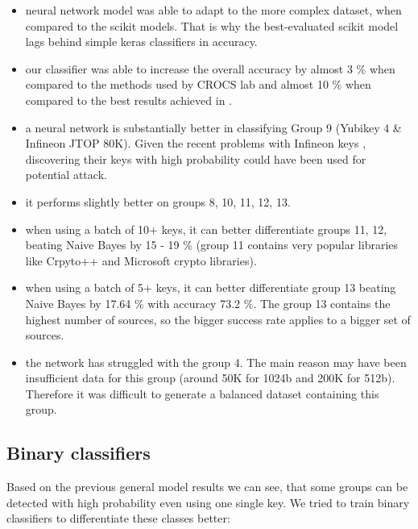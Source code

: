 \begin{itemize}

\item neural network model was able to adapt to the more complex dataset, when compared to the scikit models. That is why the best-evaluated scikit model lags behind simple keras classifiers in accuracy.

\item our classifier was able to increase the overall accuracy by almost 3 \% when compared to the methods used by CROCS lab and almost 10 \% when compared to the best results achieved in \cite{thesis_sekan}.

\item a neural network is substantially better in classifying Group 9 (Yubikey 4 \& Infineon JTOP 80K). Given the recent problems with Infineon keys \cite{svenda_2}, discovering their keys with high probability could have been used for potential attack.

\item it performs slightly better on groups 8, 10, 11, 12, 13. 

\item when using a batch of 10+ keys, it can better differentiate groups 11, 12, beating Naive Bayes by 15 - 19 \% (group 11 contains very popular libraries like Crpyto++ and Microsoft crypto libraries).

\item when using a batch of 5+ keys, it can better differentiate group 13 beating Naive Bayes by 17.64 \% with accuracy 73.2 \%. The group 13 contains the highest number of sources, so the bigger success rate applies to a bigger set of sources.

\item the network has struggled with the group 4. The main reason may have been insufficient data for this group (around 50K for 1024b and 200K for 512b). Therefore it was difficult to generate a balanced dataset containing this group.

\end{itemize}

\subsection*{Binary classifiers}

Based on the previous general model results we can see, that some groups can be detected with high probability even using one single key. We tried to train binary classifiers to differentiate these classes better:

